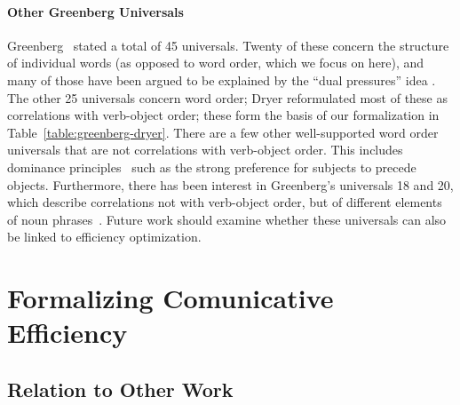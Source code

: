 \documentclass[10pt,twoside,lineno]{article}
\begin{document}


\paragraph{Other Greenberg Universals}
Greenberg~\cite{greenberg1963universals} stated a total of 45 universals.
Twenty of these concern the structure of individual words (as opposed to word order, which we focus on here), and many of those have been argued to be explained by the ``dual pressures'' idea \cite{haspelmath2006against}.
The other 25 universals concern word order; Dryer \cite{dryer1992greenbergian} reformulated most of these as correlations with verb-object order; these form the basis of our formalization in Table~\ref{table:greenberg-dryer}. %
There are a few other well-supported word order universals that are not correlations with verb-object order.
This includes dominance principles~\cite{croft2003typology} such as the strong preference for subjects to precede objects.
Furthermore, there has been interest in Greenberg's universals 18 and 20, which describe correlations not with verb-object order, but of different elements of noun phrases~\cite{cinque2005deriving, culbertson2014language, dryer2018order}.
Future work should examine whether these universals can also be linked to efficiency optimization.

\section{Formalizing Comunicative Efficiency}
\subsection{Relation to Other Work}



\end{document}
